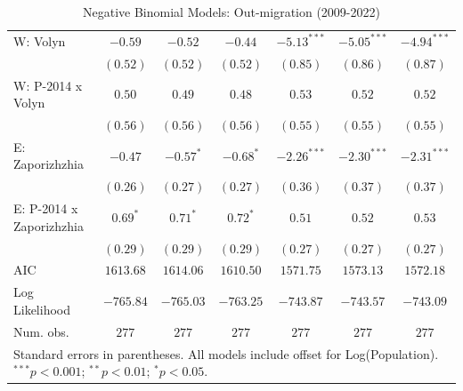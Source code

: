 \begin{table}
\begin{center}
\begin{small}
\begin{tabular}{l c c c c c c}
W: Volyn                    & $-0.59$       & $-0.52$       & $-0.44$        & $-5.13^{***}$ & $-5.05^{***}$ & $-4.94^{***}$ \\
                            & $(0.52)$      & $(0.52)$      & $(0.52)$       & $(0.85)$      & $(0.86)$      & $(0.87)$      \\
W: P-2014 x Volyn           & $0.50$        & $0.49$        & $0.48$         & $0.53$        & $0.52$        & $0.52$        \\
                            & $(0.56)$      & $(0.56)$      & $(0.56)$       & $(0.55)$      & $(0.55)$      & $(0.55)$      \\
E: Zaporizhzhia             & $-0.47$       & $-0.57^{*}$   & $-0.68^{*}$    & $-2.26^{***}$ & $-2.30^{***}$ & $-2.31^{***}$ \\
                            & $(0.26)$      & $(0.27)$      & $(0.27)$       & $(0.36)$      & $(0.37)$      & $(0.37)$      \\
E: P-2014 x Zaporizhzhia    & $0.69^{*}$    & $0.71^{*}$    & $0.72^{*}$     & $0.51$        & $0.52$        & $0.53$        \\
                            & $(0.29)$      & $(0.29)$      & $(0.29)$       & $(0.27)$      & $(0.27)$      & $(0.27)$      \\
\hline
AIC                         & $1613.68$     & $1614.06$     & $1610.50$      & $1571.75$     & $1573.13$     & $1572.18$     \\
Log Likelihood              & $-765.84$     & $-765.03$     & $-763.25$      & $-743.87$     & $-743.57$     & $-743.09$     \\
Num. obs.                   & $277$         & $277$         & $277$          & $277$         & $277$         & $277$         \\
\hline
\multicolumn{7}{l}{\tiny{Standard errors in parentheses. All models include offset for Log(Population). $^{***}p<0.001$; $^{**}p<0.01$; $^{*}p<0.05$.}}
\end{tabular}
\end{small}
\caption{Negative Binomial Models: Out-migration (2009-2022)}
\label{tab:out_migration}
\end{center}
\end{table}
